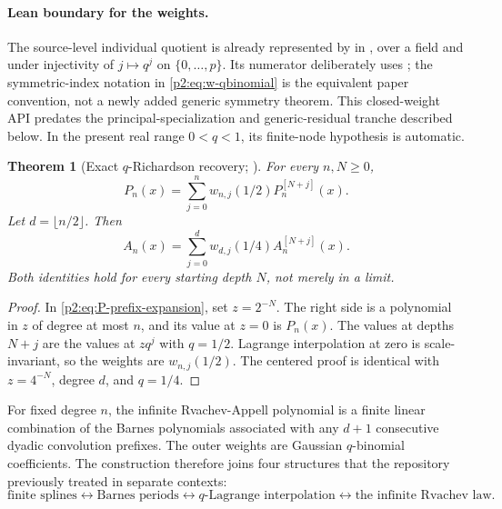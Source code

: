 \documentclass[11pt,oneside]{article}
\numberwithin{equation}{section}
\newtheorem{theorem}{Theorem}[section]
\theoremstyle{definition}
\theoremstyle{remark}
\begin{document}
\paragraph{Lean boundary for the weights.}
The source-level individual quotient is already represented by
 in
, over a field and under injectivity of
\(j\mapsto q^j\) on \(\{0,\ldots,p\}\).  Its numerator deliberately uses
; the symmetric-index notation in
\eqref{p2:eq:w-qbinomial} is the equivalent paper convention, not a newly added
generic symmetry theorem.  This closed-weight API predates the
principal-specialization and generic-residual tranche described below.  In the
present real range \(0<q<1\), its finite-node hypothesis is automatic.

\begin{theorem}[Exact $q$-Richardson recovery; \statusnew]
\label{p2:thm:exact-recovery}
For every $n,N\ge0$,
\begin{equation}
 \boxed{
 P_n(x)=\sum_{j=0}^{n}w_{n,j}(1/2)P_n^{[N+j]}(x).
 }
 \label{p2:eq:P-exact-recovery}
\end{equation}
Let $d=\lfloor n/2\rfloor$.  Then
\begin{equation}
 \boxed{
 A_n(x)=\sum_{j=0}^{d}w_{d,j}(1/4)A_n^{[N+j]}(x).
 }
 \label{p2:eq:A-exact-recovery}
\end{equation}
Both identities hold for every starting depth $N$, not merely in a limit.
\end{theorem}

\begin{proof}
In \eqref{p2:eq:P-prefix-expansion}, set $z=2^{-N}$.  The right side is a polynomial in $z$ of degree
at most $n$, and its value at $z=0$ is $P_n(x)$.  The values at depths $N+j$ are the values at
$zq^j$ with $q=1/2$.  Lagrange interpolation at zero is scale-invariant, so the weights are
$w_{n,j}(1/2)$.  The centered proof is identical with $z=4^{-N}$, degree $d$, and $q=1/4$.
\end{proof}

\begin{resultbox}
For fixed degree $n$, the infinite Rvachev-Appell polynomial is a finite linear combination of the
Barnes polynomials associated with any $d+1$ consecutive dyadic convolution prefixes.  The outer
weights are Gaussian $q$-binomial coefficients.  The construction therefore joins four structures
that the repository previously treated in separate contexts:
\[
 \text{finite splines}
 \longleftrightarrow
 \text{Barnes periods}
 \longleftrightarrow
 \text{$q$-Lagrange interpolation}
 \longleftrightarrow
 \text{the infinite Rvachev law}.
\]
\end{resultbox}
\end{document}
